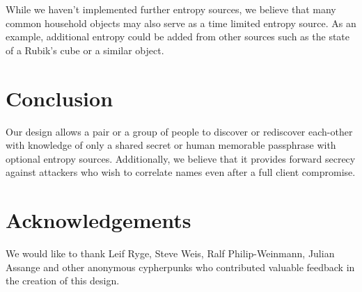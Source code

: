 \documentclass[letterpaper,twocolumn,10pt]{article}
\begin{document}
While we haven't implemented further entropy sources, we believe that many
common household objects may also serve as a time limited entropy source. As an
example, additional entropy could be added from other sources such as the state
of a Rubik's cube or a similar object.

\section{Conclusion}

Our design allows a pair or a group of people to discover or rediscover
each-other with knowledge of only a shared secret or human memorable
passphrase with optional entropy sources. Additionally, we believe that it
provides forward secrecy against attackers who wish to correlate names even
after a full client compromise.

\section*{Acknowledgements}

We would like to thank Leif Ryge, Steve Weis, Ralf Philip-Weinmann, Julian
Assange and other anonymous cypherpunks who contributed valuable feedback in
the creation of this design.

{\footnotesize 
}
\end{document}

